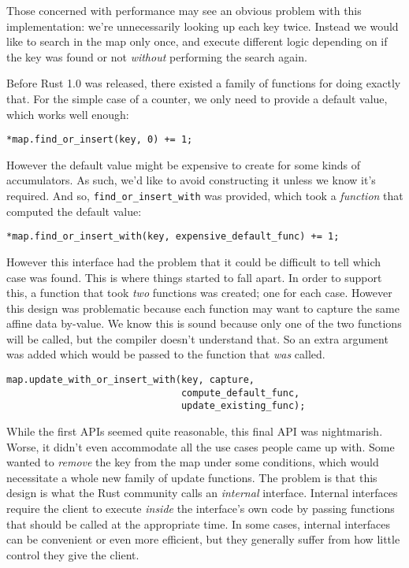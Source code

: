 Those concerned with performance may see an obvious problem with this implementation:
we're unnecessarily looking up each key twice. Instead we would like to search in the
map only once, and execute different logic depending on if the key was found or not
\emph{without} performing the search again.

Before Rust 1.0 was released, there existed a family of functions for doing exactly
that. For the simple case of a counter, we only need to provide a default value,
which works well enough:

\begin{verbatim}
*map.find_or_insert(key, 0) += 1;
\end{verbatim}

However the default value might be expensive to create for some kinds of accumulators.
As such, we'd like to avoid constructing it unless we know it's required.
And so, \texttt{find_or_insert_with} was provided, which took a
\emph{function} that computed the default value:

\begin{verbatim}
*map.find_or_insert_with(key, expensive_default_func) += 1;
\end{verbatim}

However this interface had the problem that it could be difficult to tell which
case was found. This is where things started to fall apart. In order to support
this, a function that took \emph{two} functions was created; one for each case. However this
design was problematic because each function
may want to capture the same affine data by-value. We know this is sound because only
one of the two functions will be called, but the compiler doesn't understand that.
So an extra argument was added which would be passed to the function that \emph{was}
called.

\begin{verbatim}
map.update_with_or_insert_with(key, capture,
                               compute_default_func,
                               update_existing_func);
\end{verbatim}

While the first APIs seemed quite reasonable, this final API was nightmarish. Worse,
it didn't even accommodate all the use cases people came up with. Some wanted
to \emph{remove} the key from the map under some conditions, which would necessitate
a whole new family of update functions. The problem is that this design is what the
Rust community calls an \emph{internal} interface. Internal interfaces require the client
to execute \emph{inside} the interface's own code by passing functions that should be
called at the appropriate time. In some cases, internal interfaces can be convenient
or even more efficient, but they generally suffer from how little control they give
the client.

